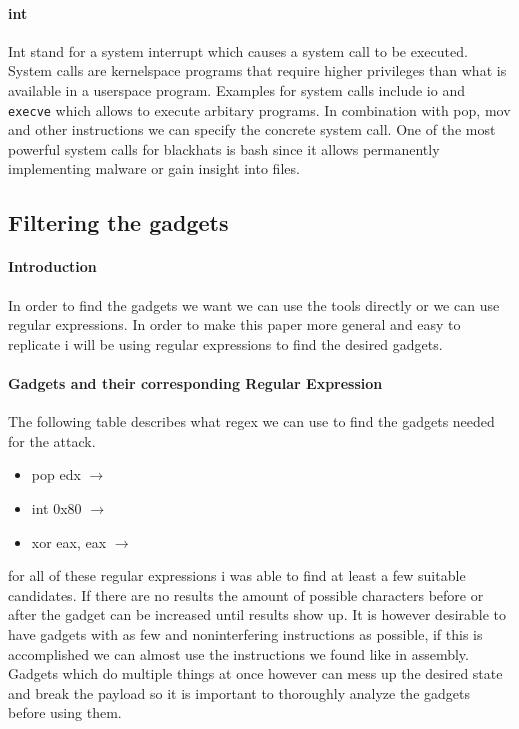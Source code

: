 \documentclass[journal=tosc,submission]{iacrtrans}
\begin{document}
\paragraph{int}
Int stand for a system interrupt which causes a system call to be executed. System calls are kernelspace programs that require higher privileges than what is available in a userspace program. Examples for system calls include io and \Verb+execve+ which allows to execute arbitary programs. In combination with pop, mov and other instructions we can specify the concrete system call. One of the most powerful system calls for blackhats is bash since it allows permanently implementing malware or gain insight into files.
\subsection{Filtering the gadgets}
\paragraph{Introduction}
In order to find the gadgets we want we can use the tools directly or we can use regular expressions. In order to make this paper more general and easy to replicate i will be using regular expressions to find the desired gadgets.
\paragraph{Gadgets and their corresponding Regular Expression}
The following table describes what regex we can use to find the gadgets needed for the attack.

\begin{itemize}
\item pop edx  $\rightarrow$ 

\item int 0x80  $\rightarrow$  

\item xor eax, eax  $\rightarrow$  
\end{itemize}

for all of these regular expressions i was able to find at least a few suitable candidates. If there are no results the amount of possible characters before or after the gadget can be increased until results show up. It is however desirable to have gadgets with as few and noninterfering instructions as possible, if this is accomplished we can almost use the instructions we found like in assembly. Gadgets which do multiple things at once however can mess up the desired state and break the payload so it is important to thoroughly analyze the gadgets before using them.
\end{document}
